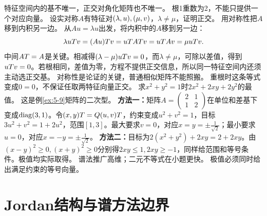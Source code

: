{特征空间内的基不唯一，正交对角化矩阵也不唯一。}
{根1重数为2，不能只提供一个对应向量。}
{设实对称$A$有特征对$(\lambda,u),(\mu,v)$，$\lambda\ne\mu$，证明正交。}
{用对称性把$A$移到内积另一边。}
{从$Au=\lambda u$出发，将内积中的$A$移到另一边：
\[\lambda uT v=(Au)T v=uT AT v=uT Av=\mu uT v.\]
中间$AT=A$是关键。相减得$(\lambda-\mu)uT v=0$，而$\lambda\ne\mu$，可除以差值，得到$uT v=0$。若根相同，差值为零，方程不提供正交信息，所以同一特征空间内还须主动选正交基。}
{对称性是论证的关键，普通相似矩阵不能照搬。}
{重根时这条等式变成$0=0$，不保证任取两特征向量正交。}
{求$x^2+y^2=1$时$2x^2+2xy+2y^2$的最值。}
{这是例\ref{ex:5-9}矩阵的二次型。}
{\textbf{方法一：}矩阵$A=\begin{pmatrix}2&1\\1&2\end{pmatrix}$在单位和差基下变成$\operatorname{diag}(3,1)$。令$(x,y)T=Q(u,v)T$，约束变成$u^2+v^2=1$，目标$3u^2+v^2=1+2u^2$，范围$[1,3]$。最大要求$v=0$，对应$x=y=\pm\frac{1}{\sqrt2}$；最小要求$u=0$，对应$x=-y=\pm\frac{1}{\sqrt2}$。
\textbf{方法二：}目标为$2(x^2+y^2)+2xy=2+2xy$。由$(x-y)^2\ge0,(x+y)^2\ge0$分别得$2xy\le1,2xy\ge-1$，同样给范围和等号条件。极值均实际取得。}
{谱法推广高维；二元不等式在小题更快。}
{极值必须同时给出满足约束的等号向量。}


\section{Jordan结构与谱方法边界}
